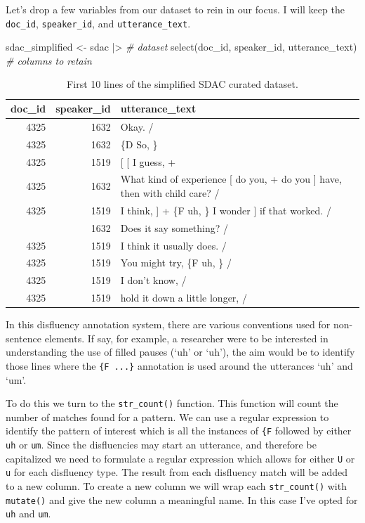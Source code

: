 \documentclass[
  letterpaper,
]{scrbook}
\newenvironment{Shaded}{\begin{snugshade}}{\end{snugshade}}
\newcommand{\CommentTok}[1]{\textcolor[rgb]{0.00,0.00,0.00}{\textit{#1}}}
\newcommand{\FunctionTok}[1]{\textcolor[rgb]{0.00,0.00,0.00}{#1}}
\newcommand{\NormalTok}[1]{\textcolor[rgb]{0.00,0.00,0.00}{#1}}
\newcommand{\OtherTok}[1]{\textcolor[rgb]{0.00,0.00,0.00}{#1}}
\newcommand{\SpecialCharTok}[1]{\textcolor[rgb]{0.00,0.00,0.00}{#1}}
\begin{document}
Let's drop a few variables from our dataset to rein in our focus. I will
keep the \texttt{doc\_id}, \texttt{speaker\_id}, and
\texttt{utterance\_text}.

\begin{Shaded}
\begin{Highlighting}[]
\NormalTok{sdac\_simplified }\OtherTok{\textless{}{-}} 
\NormalTok{  sdac }\SpecialCharTok{|\textgreater{}} \CommentTok{\# dataset}
  \FunctionTok{select}\NormalTok{(doc\_id, speaker\_id, utterance\_text) }\CommentTok{\# columns to retain}
\end{Highlighting}
\end{Shaded}

\hypertarget{tbl-td-sdac-simple-preview}{}
\begin{table}
\caption{\label{tbl-td-sdac-simple-preview}First 10 lines of the simplified SDAC curated dataset. }\tabularnewline

\centering
\begin{tabular}{rrl}
\toprule
doc\_id & speaker\_id & utterance\_text\\
\midrule
4325 & 1632 & Okay.  /\\
4325 & 1632 & \{D So, \}\\
4325 & 1519 & {}[ [ I guess, +\\
4325 & 1632 & What kind of experience [ do you, + do you ] have, then with child care? /\\
4325 & 1519 & I think, ] + \{F uh, \} I wonder ] if that worked. /\\
\addlinespace
4325 & 1632 & Does it say something? /\\
4325 & 1519 & I think it usually does.  /\\
4325 & 1519 & You might try, \{F uh, \}  /\\
4325 & 1519 & I don't know,  /\\
4325 & 1519 & hold it down a little longer,  /\\
\bottomrule
\end{tabular}
\end{table}

In this disfluency annotation system, there are various conventions used
for non-sentence elements. If say, for example, a researcher were to be
interested in understanding the use of filled pauses (`uh' or `uh'), the
aim would be to identify those lines where the \texttt{\{F\ ...\}}
annotation is used around the utterances `uh' and `um'.

To do this we turn to the \texttt{str\_count()} function. This function
will count the number of matches found for a pattern. We can use a
regular expression to identify the pattern of interest which is all the
instances of \texttt{\{F} followed by either \texttt{uh} or \texttt{um}.
Since the disfluencies may start an utterance, and therefore be
capitalized we need to formulate a regular expression which allows for
either \texttt{U} or \texttt{u} for each disfluency type. The result
from each disfluency match will be added to a new column. To create a
new column we will wrap each \texttt{str\_count()} with
\texttt{mutate()} and give the new column a meaningful name. In this
case I've opted for \texttt{uh} and \texttt{um}.
\end{document}
